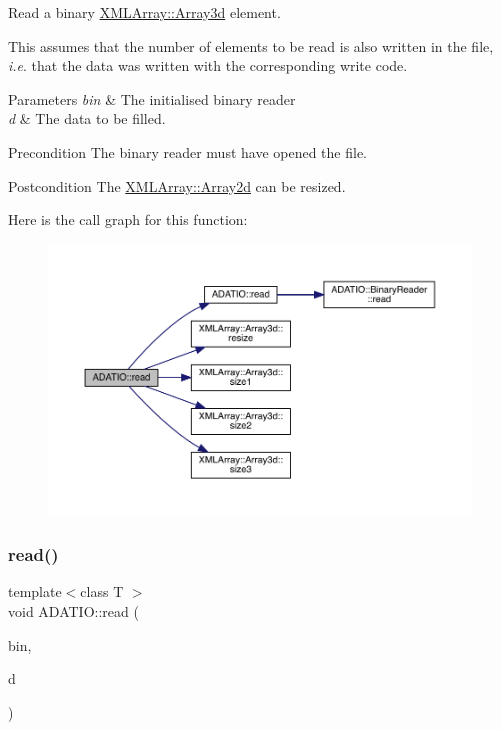 Read a binary \mbox{\hyperlink{classXMLArray_1_1Array3d}{X\+M\+L\+Array\+::\+Array3d}} element. 

This assumes that the number of elements to be read is also written in the file, {\itshape i.\+e}. that the data was written with the corresponding write code. 
\begin{DoxyParams}{Parameters}
{\em bin} & The initialised binary reader \\
\hline
{\em d} & The data to be filled.\\
\hline
\end{DoxyParams}
\begin{DoxyPrecond}{Precondition}
The binary reader must have opened the file. 
\end{DoxyPrecond}
\begin{DoxyPostcond}{Postcondition}
The \mbox{\hyperlink{classXMLArray_1_1Array2d}{X\+M\+L\+Array\+::\+Array2d}} can be resized. 
\end{DoxyPostcond}
Here is the call graph for this function\+:
\nopagebreak
\begin{figure}[H]
\begin{center}
\leavevmode
\includegraphics[width=350pt]{d0/dba/namespaceADATIO_ac8f475cc894abb16b89f3e73e1132bce_cgraph}
\end{center}
\end{figure}
\mbox{\label{namespaceADATIO_a0e3333d0774c69f2c6a38b013e23d02b}} 
\subsubsection{\texorpdfstring{read()}{read()}\hspace{0.1cm}{\footnotesize\ttfamily [22/28]}}
{\footnotesize\ttfamily template$<$class T $>$ \\
void A\+D\+A\+T\+I\+O\+::read (\begin{DoxyParamCaption}\item[{\mbox{\hyperlink{classADATIO_1_1BinaryReader}{Binary\+Reader}} \&}]{bin,  }\item[{\mbox{\hyperlink{classXMLArray_1_1Array4d}{X\+M\+L\+Array\+::\+Array4d}}$<$ T $>$ \&}]{d }\end{DoxyParamCaption})\hspace{0.3cm}{\ttfamily [inline]}}




